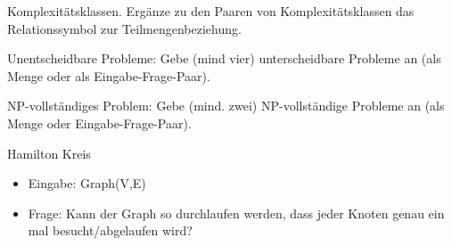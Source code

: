 \documentclass[10pt, a4paper]{exam}
\begin{document}
\begin{questions}

  \question Komplexitätsklassen. Ergänze zu den Paaren von Komplexitätsklassen das Relationssymbol zur Teilmengenbeziehung.

  \question Unentscheidbare Probleme: Gebe (mind vier) unterscheidbare Probleme an (als Menge oder als Eingabe-Frage-Paar).
  \begin{solution}
  \end{solution}

  \question NP-vollständiges Problem: Gebe (mind. zwei) NP-vollständige Probleme an (als Menge oder Eingabe-Frage-Paar).
  \begin{solution}

    Hamilton Kreis
    \begin{itemize}
      \item Eingabe: Graph(V,E)
      \item Frage: Kann der Graph so durchlaufen werden, dass jeder Knoten genau ein mal besucht/abgelaufen wird?
    \end{itemize}



\end{solution}
\end{questions}
\end{document}
